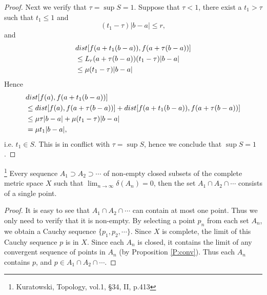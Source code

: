 \begin{proof}
Next we verify that $\tau=\sup S=1$. Suppose that $\tau<1$, there exist a
$t_1>\tau$ such that $t_1\leq 1$ and 
\[
  (t_1-\tau)|b-a| \leq r,
\]
and 
\begin{align*}
  & dist[f(a+t_1(b-a)),f(a+\tau (b-a))]  \notag \\
  &\leq L_r(a+\tau (b-a)) (t_1 - \tau) |b-a|  \notag \\
  &\leq \mu (t_1-\tau) |b-a|  \notag
\end{align*}
Hence
\begin{align*}
  &dist[f(a),f(a+ t_1 (b-a))]  \\ \notag
  &\leq dist[f(a),f(a+\tau (b-a))] + dist[f(a+t_1(b-a)),f(a+\tau (b-a))] 
    \\ \notag
  &\leq \mu \tau |b-a| + \mu (t_1 - \tau) |b-a| \notag \\
  &= \mu t_1 |b-a|, \notag
\end{align*}
i.e. $t_1\in S$. This is in conflict with $\tau=\sup S$, hence we conclude that
$\sup S=1$.
\end{proof}

\begin{theorem} \label{T:cantor_int}
\footnote{Kuratowski, Topology, vol.1, \S 34, II, p.413}
Every sequence $A_1\supset A_2\supset\cdots$ of non-empty closed subsets of
the complete metric space $X$ such that $\lim_{n\to\infty} \delta(A_n)=0$, then 
the set $A_1\cap A_2\cap\cdots$ consists of a single point.
\end{theorem}
\begin{proof}
It is easy to see that $A_1\cap A_2\cap\cdots$ can contain at most one point.
Thus we only need to verify that it is non-empty.
By selecting a point $p_n$ from each set $A_n$, we obtain a Cauchy sequence 
$\{p_1,p_2,\cdots\}$. Since $X$ is complete, the limit of this Cauchy sequence
$p$ is in $X$. Since each $A_n$ is closed, it contains the limit of any
convergent sequence of points in $A_n$ (by Proposition \ref{P:conv}).
Thus each $A_n$ contains $p$, and $p\in A_1\cap A_2\cap \cdots$.
\end{proof}

